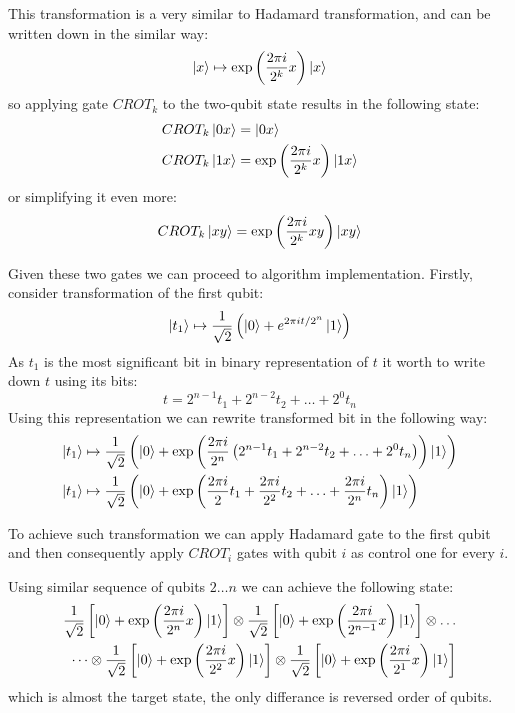 This transformation is a very similar to Hadamard transformation, and can be written down in the similar way:
\[
    \ket{x} \mapsto \exp\left( \frac{2\pi i}{2^k} x \right)\ket{x}
\]
so applying gate $CROT_k$ to the two-qubit state results in the following state:
\begin{align*}
    CROT_k\ket{0x} &= \ket{0x} \\
    CROT_k\ket{1x} &= \exp\left( \frac{2\pi i}{2^k} x \right)\ket{1x}
\end{align*}
or simplifying it even more:
\[
    CROT_k\ket{xy} = \exp\left( \frac{2\pi i}{2^k} xy \right)\ket{xy}
\]

Given these two gates we can proceed to algorithm implementation.
Firstly, consider transformation of the first qubit:
\[
    \ket{t_1} \mapsto \frac{1}{\sqrt {2}}\left( \ket{0} + e^{ 2\pi i t/2^n }\ket{1} \right)
\]
As $t_1$ is the most significant bit in binary representation of $t$ it worth to write down $t$ using its bits:
\[
    t = 2^{n-1}t_1 + 2^{n-2}t_2 + \ldots + 2^{0}t_n
\]
Using this representation we can rewrite transformed bit in the following way:
\begin{align*}
    \ket{t_1} &\mapsto \frac{1}{\sqrt {2}}\left( \ket{0} + \exp \left( \frac{2\pi i}{2^n} \left( 2^{n-1}t_1 + 2^{n-2}t_2 + \ldots + 2^{0}t_n \right) \right)\ket{1} \right) \\
    \ket{t_1} &\mapsto \frac{1}{\sqrt {2}}\left( \ket{0} + \exp \left( \frac{2\pi i}{2} t_1 + \frac{2\pi i}{2^2}t_2 + \ldots + \frac{2\pi i}{2^n}t_n \right)\ket{1} \right)
\end{align*}

To achieve such transformation we can apply Hadamard gate to the first qubit and then consequently apply $CROT_i$ gates with qubit $i$ as control one for every $i$.

Using similar sequence of qubits $2 \dots n$ we can achieve the following state:
\begin{align*}
    \frac{1}{\sqrt {2}} \left[ \ket{0} + \exp \left( \frac{2\pi i}{2^n}x \right)\ket{1} \right] \otimes
    \frac{1}{\sqrt {2}} \left[ \ket{0} + \exp \left( \frac{2\pi i}{2^{n-1}}x \right)\ket{1} \right] \otimes \dots \\
    \dots \otimes
    \frac{1}{\sqrt {2}} \left[ \ket{0} + \exp \left( \frac{2\pi i}{2^2}x \right)\ket{1} \right] \otimes
    \frac{1}{\sqrt {2}} \left[ \ket{0} + \exp \left( \frac{2\pi i}{2^1}x \right)\ket{1} \right]
\end{align*}
which is almost the target state, the only differance is reversed order of qubits.


